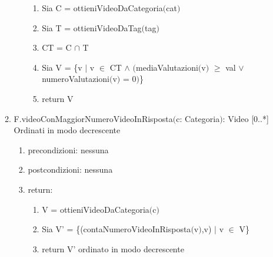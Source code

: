\documentclass{article}
\begin{document}
\begin{enumerate}
\begin{enumerate}
\begin{enumerate}
            \begin{enumerate}
                \item Sia C = ottieniVideoDaCategoria$($cat$)$
                \item Sia T = ottieniVideoDaTag$($tag$)$
                \item CT = C $\cap$ T
                \item Sia V = \{v $|$ v $\in$ CT $\land$ $($mediaValutazioni$($v$)$ $\geq$ val $\lor$ numeroValutazioni$($v$)$ = 0$)$\}
                \item return V
            \end{enumerate}
        \end{enumerate}
        \item F.videoConMaggiorNumeroVideoInRisposta$($c: Categoria$)$: Video [0..*] Ordinati in modo decrescente
        \begin{enumerate}
            \item precondizioni: nessuna
            \item postcondizioni: nessuna
            \item return:
            \begin{enumerate}
                \item V = ottieniVideoDaCategoria$($c$)$
                \item Sia V' = \{(contaNumeroVideoInRisposta$($v$)$,v) $|$ v $\in$ V\}
                \item return V' ordinato in modo decrescente
            \end{enumerate}
        \end{enumerate}
        

\end{enumerate}
\end{enumerate}
\end{document}
